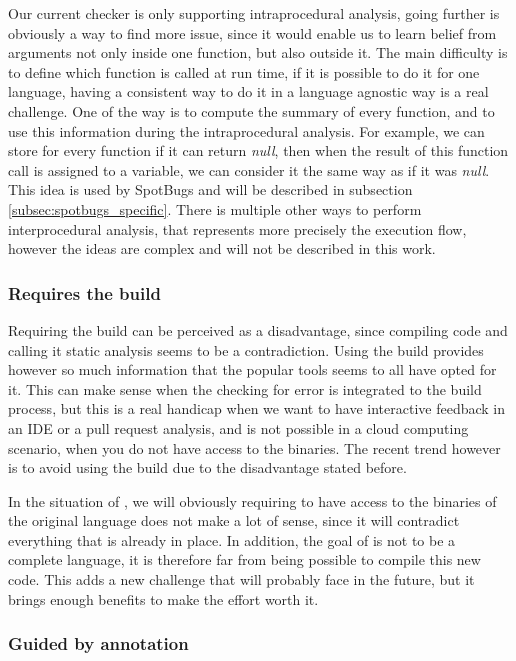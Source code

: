 Our current checker is only supporting intraprocedural analysis, going further is obviously a way to find more issue, since it would enable us to learn belief from arguments not only inside one function, but also outside it.
The main difficulty is to define which function is called at run time, if it is possible to do it for one language, having a consistent way to do it in a language agnostic way is a real challenge. 
One of the way is to compute the summary of every function, and to use this information during the intraprocedural analysis. 
For example, we can store for every function if it can return \emph{null}, then when the result of this function call is assigned to a variable, we can consider it the same way as if it was \emph{null}. 
This idea is used by SpotBugs and will be described in subsection \ref{subsec:spotbugs_specific}. 
There is multiple other ways to perform interprocedural analysis, that represents more precisely the execution flow, however the ideas are complex and will not be described in this work.

\subsubsection{Requires the build}
\label{subsubsec:require_build}

Requiring the build can be perceived as a disadvantage, since compiling code and calling it static analysis seems to be a contradiction.
Using the build provides however so much information that the popular tools seems to all have opted for it.
This can make sense when the checking for error is integrated to the build process, but this is a real handicap when we want to have interactive feedback in an IDE or a pull request analysis, and is not possible in a cloud computing scenario, when you do not have access to the binaries. 
The recent trend however is to avoid using the build due to the disadvantage stated before.

In the situation of \slang{}, we will obviously requiring to have access to the binaries of the original language does not make a lot of sense, since it will contradict everything that is already in place.
In addition, the goal of \slang{} is not to be a complete language, it is therefore far from being possible to compile this new code. 
This adds a new challenge that \slang{} will probably face in the future, but it brings enough benefits to make the effort worth it.

\subsubsection{Guided by annotation}
\label{subsubsec:guided_by_annotation}

